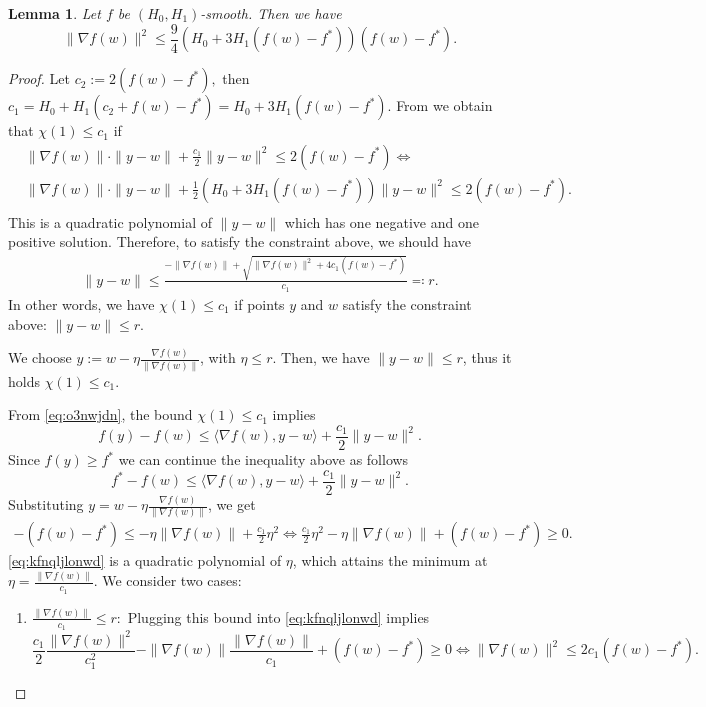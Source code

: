 \documentclass[a4paper,11pt]{article}
\newcommand{\1}{\mathbbm{1}}
\theoremstyle{plain}
\newtheorem{lemma}{Lemma}
\begin{document}
\begin{lemma}\label{lem:gradient_bound} Let $f$ be $(H_0,H_1)$-smooth. Then we have 
\[
\|\nabla f(w)\|^2 \le \frac{9}{4}(H_0 + 3H_1(f(w) - f^*))(f(w) - f^*).
\]
\end{lemma}
\begin{proof}
    Let $c_2 := 2(f(w) - f^*),$ then $c_1 = H_0 + H_1(c_2 + f(w) - f^*) = H_0 + 3H_1(f(w) - f^*).$ From  we obtain that $\chi(1) \le c_1$ if 
    \begin{align*}
       & \|\nabla f(w)\|\cdot\|y-w\| + \frac{c_1}{2}\|y-w\|^2 \le 2(f(w) - f^*) \Longleftrightarrow\; \\ & \|\nabla f(w)\|\cdot \|y-w\| + \frac{1}{2}(H_0 + 3H_1(f(w) - f^*))\|y-w\|^2 \le 2(f(w) - f^*).\\ 
    \end{align*}
    This is a quadratic polynomial of $\|y-w\|$ which has one negative and one positive solution. Therefore, to satisfy the constraint above, we should have 
    \begin{align*}
        \|y-w\| \le \frac{-\|\nabla f(w)\| + \sqrt{\|\nabla f(w)\|^2 + 4c_1(f(w) - f^*)}}{c_1} \eqcolon r.
    \end{align*}
    In other words, we have $\chi(1) \le c_1$ if points $y$ and $w$ satisfy the constraint above: $\|y-w\| \le r.$ 

    We choose $y:=w-\eta \frac{\nabla f(w)}{\|\nabla f(w)\|}$, with $\eta \leq r$. Then, we have $\|y-w\| \leq r$, thus it holds $\chi(1) \leq c_1$.
    
    From \eqref{eq:o3nwjdn}, the bound $\chi(1) \le c_1$ implies 
    \[
    f(y) - f(w) \le \langle\nabla f(w), y-w\rangle + \frac{c_1}{2}\|y-w\|^2.
    \]
    Since $f(y) \ge f^*$ we can continue the inequality above as follows
     \[
    f^* - f(w) \le \langle\nabla f(w), y-w\rangle + \frac{c_1}{2}\|y-w\|^2.
    \]
    Substituting $y=w-\eta \frac{\nabla f(w)}{\|\nabla f(w)\|}$, we get
    \begin{align}\label{eq:kfnqljlonwd}
    -(f(w) - f^*) \le -\eta\|\nabla f(w)\| + \frac{c_1}{2}\eta^2 \Longleftrightarrow \frac{c_1}{2}\eta^2 - \eta\|\nabla f(w)\| + (f(w) -f^*) \ge 0.
    \end{align}
 \eqref{eq:kfnqljlonwd} is a quadratic polynomial of $\eta$, which attains the minimum at $\eta = \frac{\|\nabla f(w)\|}{c_1}.$ We consider two cases: 
    \begin{enumerate}
        \item $\frac{\|\nabla f(w)\|}{c_1} \le r:$ Plugging this bound into \eqref{eq:kfnqljlonwd} implies
        \[
        \frac{c_1}{2}\frac{\|\nabla f(w)\|^2}{c_1^2} - \|\nabla f(w)\| \frac{\|\nabla f(w)\|}{c_1} + (f(w) - f^*) \ge 0 \Leftrightarrow \|\nabla f(w)\|^2 \le 2c_1(f(w) - f^*). 
        \]



\end{enumerate}
\end{proof}
\end{document}
